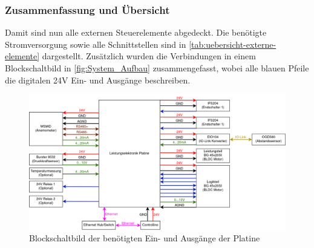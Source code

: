 \subsubsection{Zusammenfassung und Übersicht}
Damit sind nun alle externen Steuerelemente abgedeckt. Die benötigte Stromversorgung sowie alle Schnittstellen sind in \autoref{tab:uebersicht-externe-elemente} dargestellt. Zusätzlich wurden die Verbindungen in einem Blockschaltbild in \autoref{fig:System_Aufbau} zusammengefasst, wobei alle blauen Pfeile die digitalen 24V Ein- und Ausgänge beschreiben.
\begin{figure}[H]
	\centering
	\includegraphics[width=1.0\textwidth]{images/System/Systemaufbau.drawio.png}
	\caption{Blockschaltbild der benötigten Ein- und Ausgänge der Platine}
	\label{fig:System_Aufbau}
\end{figure}
